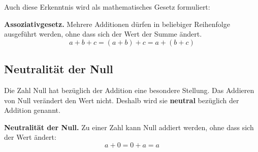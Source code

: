 Auch diese Erkenntnis wird als mathematisches Gesetz formuliert:

\begin{theorem}
\textbf{Assoziativgesetz.} Mehrere Additionen dürfen in beliebiger Reihenfolge ausgeführt werden, ohne dass sich der Wert der Summe ändert.
\[
  a + b + c = (a + b) + c = a + (b + c)
\]
\end{theorem}

\subsection{Neutralität der Null}

Die Zahl Null hat bezüglich der Addition eine besondere Stellung. Das Addieren von Null verändert den Wert nicht. Deshalb wird sie \textbf{neutral} bezüglich der Addition genannt.
\begin{theorem}
  \textbf{Neutralität der Null.} Zu einer Zahl kann Null addiert werden, ohne dass sich der Wert ändert:
  \[
    a + 0 = 0 + a = a
  \]
\end{theorem}
